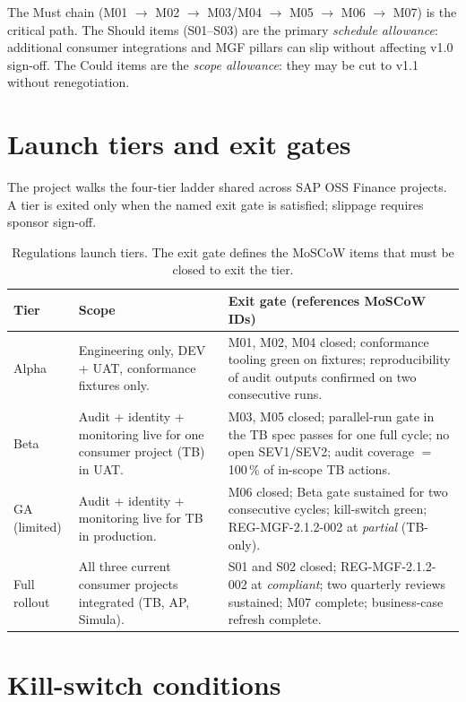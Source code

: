 \noindent
The Must chain (M01 $\to$ M02 $\to$ M03/M04 $\to$ M05 $\to$ M06 $\to$
M07) is the critical path. The Should items (S01--S03) are the
primary \emph{schedule allowance}: additional consumer integrations
and MGF pillars can slip without affecting v1.0 sign-off. The Could
items are the \emph{scope allowance}: they may be cut to v1.1 without
renegotiation.

\section{Launch tiers and exit gates}\label{sec:reg-launch-tiers}

The project walks the four-tier ladder shared across SAP OSS Finance
projects. A tier is exited only when the named exit gate is satisfied;
slippage requires sponsor sign-off.

\begin{table}[htbp]
\centering
\caption{Regulations launch tiers. The exit gate defines the MoSCoW
items that must be closed to exit the tier.}
\label{tab:reg-launch-tiers}
\footnotesize
\begin{tabularx}{\linewidth}{@{}l l X@{}}
\toprule
\textbf{Tier} & \textbf{Scope} & \textbf{Exit gate (references MoSCoW IDs)} \\ \midrule
Alpha & Engineering only, DEV + UAT, conformance fixtures only. & M01, M02, M04 closed; conformance tooling green on fixtures; reproducibility of audit outputs confirmed on two consecutive runs. \\
Beta  & Audit + identity + monitoring live for one consumer project (TB) in UAT. & M03, M05 closed; parallel-run gate in the TB spec passes for one full cycle; no open SEV1/SEV2; audit coverage $=$ 100\,\% of in-scope TB actions. \\
GA (limited) & Audit + identity + monitoring live for TB in production. & M06 closed; Beta gate sustained for two consecutive cycles; kill-switch green; REG-MGF-2.1.2-002 at \textit{partial} (TB-only). \\
Full rollout & All three current consumer projects integrated (TB, AP, Simula). & S01 and S02 closed; REG-MGF-2.1.2-002 at \textit{compliant}; two quarterly reviews sustained; M07 complete; business-case refresh complete. \\
\bottomrule
\end{tabularx}
\end{table}

\section{Kill-switch conditions}\label{sec:reg-kill-switch}

